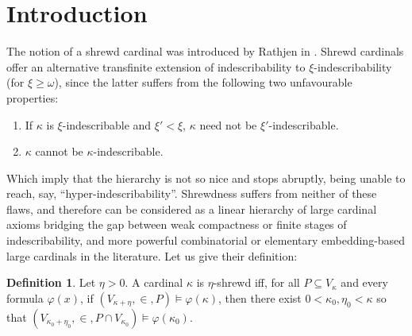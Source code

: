 \documentclass{article}
\title{\rfont \mytitle}
\author{\authorfont \myauthor}
\date{\rfont \today}
\theoremstyle{definition}
\newtheorem{definition}{Definition}[section]
\theoremstyle{plain}
\theoremstyle{plain}
\theoremstyle{plain}
\theoremstyle{plain}
\theoremstyle{remark}
\theoremstyle{remark}
\theoremstyle{remark}
\theoremstyle{plain}
\theoremstyle{plain}
\theoremstyle{plain}
\begin{document}
\maketitle

\begin{abstract}
We share both recent and older, well-known results regarding the notions of stable ordinals and shrewd cardinals. We then argue that $\Sigma_2$-nonprojectible ordinals may be considered as recursive analogues to subtle cardinals, a highly combinatorial type of cardinal related to Jensen's fine structure, due to the latter possessing a characterisation in terms of shrewdnesss.
\end{abstract}

\section{Introduction}

The notion of a shrewd cardinal was introduced by Rathjen in \cite{rathjen}. Shrewd cardinals offer an alternative transfinite extension of indescribability to $\xi$-indescribability (for $\xi \geq \omega$), since the latter suffers from the following two unfavourable properties:

\begin{enumerate}
    \item If $\kappa$ is $\xi$-indescribable and $\xi' < \xi$, $\kappa$ need not be $\xi'$-indescribable.
    \item $\kappa$ cannot be $\kappa$-indescribable.
\end{enumerate}

Which imply that the hierarchy is not so nice and stops abruptly, being unable to reach, say, ``hyper-indescribability''. Shrewdness suffers from neither of these flaws, and therefore can be considered as a linear hierarchy of large cardinal axioms bridging the gap between weak compactness or finite stages of indescribability, and more powerful combinatorial or elementary embedding-based large cardinals in the literature. Let us give their definition:

\begin{definition}
\label{ShrewdCardinal}
Let $\eta > 0$. A cardinal $\kappa$ is $\eta$-shrewd iff, for all $P \subseteq V_\kappa$ and every formula $\varphi(x)$, if $(V_{\kappa+\eta}, \in, P) \models \varphi(\kappa)$, then there exist $0 < \kappa_0, \eta_0 < \kappa$ so that $(V_{\kappa_0+\eta_0}, \in, P \cap V_{\kappa_0}) \models \varphi(\kappa_0)$.
\end{definition}
\end{document}
